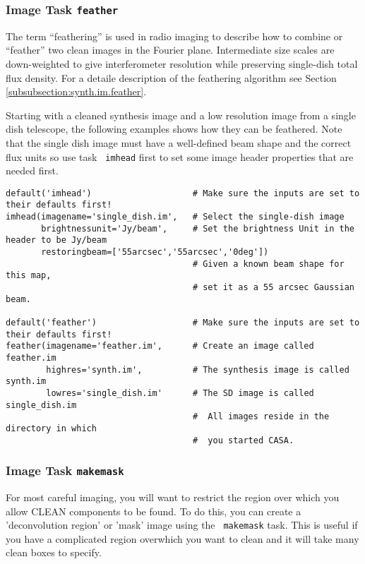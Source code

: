 \subsubsection{Image Task {\tt feather}}

The term ``feathering'' is used in radio imaging to describe how to
combine or ``feather'' two clean images in the Fourier plane.
Intermediate size scales are down-weighted to give interferometer
resolution while preserving single-dish total flux density.  For a
detaile description of the feathering algorithm see Section
\ref{subsubsection:synth.im.feather}.  

Starting with a cleaned synthesis image and a low resolution image
from a single dish telescope, the following examples shows how they
can be feathered.  Note that the single dish image must have a
well-defined beam shape and the correct flux units so use task {\tt
imhead} first to set some image header properties that are needed
first. 

\small
\begin{verbatim}
default('imhead')                    # Make sure the inputs are set to their defaults first!
imhead(imagename='single_dish.im',   # Select the single-dish image
       brightnessunit='Jy/beam',     # Set the brightness Unit in the header to be Jy/beam
       restoringbeam=['55arcsec','55arcsec','0deg'])
                                     # Given a known beam shape for this map, 
                                     # set it as a 55 arcsec Gaussian beam.  

default('feather')                   # Make sure the inputs are set to their defaults first!
feather(imagename='feather.im',      # Create an image called feather.im
        highres='synth.im',          # The synthesis image is called synth.im
        lowres='single_dish.im'      # The SD image is called single_dish.im
                                     #  All images reside in the directory in which 
                                     #  you started CASA.  
\end{verbatim}
\normalsize


\subsubsection{Image Task {\tt makemask}}

For most careful imaging, you will want to restrict the region over
which you allow CLEAN components to be found.  To do this, you can
create a 'deconvolution region' or 'mask' image using the {\tt
makemask} task.  This is useful if you have a complicated region
overwhich you want to clean and it will take many clean boxes to
specify.  

